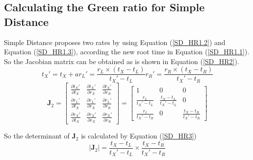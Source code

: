 \documentclass{bmcart}
\begin{document}
\begin{backmatter}
\subsection*{Calculating the Green ratio for Simple Distance}
Simple Distance proposes two rates by using Equation (\ref{SD_HR1.2}) and Equation (\ref{SD_HR1.3}), according the new root time in Equation (\ref{SD_HR1.1}). So the Jacobian matrix can be obtained as is shown in Equation (\ref{SD_HR2}).
\begin{subequations}\label{SD_HR1}
\begin{equation}\label{SD_HR1.1}
 {t_X}' = {t_X} + a
\end{equation}
\begin{equation} \label{SD_HR1.2}
{r_L}' = \frac{{{r_L} \times ({t_X} - {t_L})}}{{{t_X}' - {t_L}}}
\end{equation}
\begin{equation}\label{SD_HR1.3}
  {r_R}' = \frac{{{r_R} \times ({t_X} - {t_R})}}{{{t_X}' - {t_R}}}
\end{equation}
\end{subequations}
\begin{equation}\label{SD_HR2}
{{\mathbf{J}}_2} = \left[ {\begin{array}{*{20}{c}}
  {\frac{{\partial {t_X}'}}{{\partial {t_X}}}}&{\frac{{\partial {t_X}'}}{{\partial {r_X}}}}&{\frac{{\partial {t_X}'}}{{\partial {r_R}}}} \\
  {\frac{{\partial {r_L}'}}{{\partial {t_X}}}}&{\frac{{\partial {r_L}'}}{{\partial {r_X}}}}&{\frac{{\partial {r_L}'}}{{\partial {r_R}}}} \\
  {\frac{{\partial {r_X}'}}{{\partial {t_X}}}}&{\frac{{\partial {r_X}'}}{{\partial {r_X}}}}&{\frac{{\partial {r_X}'}}{{\partial {r_R}}}}
\end{array}} \right] = \left[ {\begin{array}{*{20}{c}}
  1&0&0 \\
  {\frac{{{r_L}}}{{{t_X}' - {t_L}}}}&{\frac{{{t_X} - {t_L}}}{{{t_X}' - {t_L}}}}&0 \\
  {\frac{{{r_x}}}{{{t_X}' - {t_R}}}}&0&{\frac{{{t_X} - {t_R}}}{{{t_X}' - {t_R}}}}
\end{array}} \right]
\end{equation}

So the determinant of ${{\mathbf{J}}_2}$ is calculated by Equation (\ref{SD_HR3})
\begin{equation}\label{SD_HR3}
\left| {{{\mathbf{J}}_2}} \right| = \frac{{{t_X} - {t_L}}}{{{t_X}' - {t_L}}} \times \frac{{{t_X} - {t_R}}}{{{t_X}' - {t_R}}}
\end{equation}

\end{backmatter}
\end{document}

